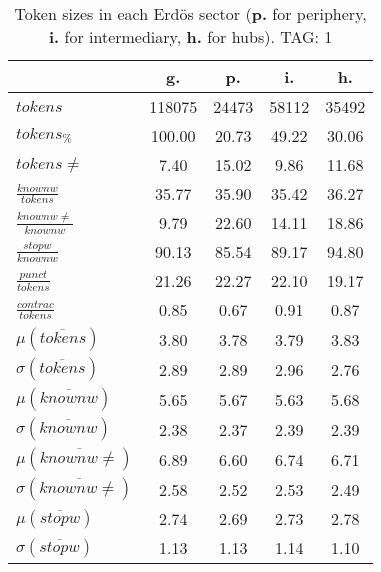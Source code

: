 \begin{table}[h!]
\begin{center}
\begin{tabular}{| l || c | c | c | c |}\hline
 & {\bf g.} & {\bf p.} & {\bf i.} & {\bf h.} \\\hline\hline
$tokens$ & 118075  & 24473  & 58112  & 35492 \\
$tokens_{\%}$ & 100.00  & 20.73  & 49.22  & 30.06 \\
$tokens \neq$ & 7.40  & 15.02  & 9.86  & 11.68 \\\hline
$\frac{knownw}{tokens}$ & 35.77  & 35.90  & 35.42  & 36.27 \\
$\frac{knownw \neq}{knownw}$ & 9.79  & 22.60  & 14.11  & 18.86 \\\hline
$\frac{stopw}{knownw}$ & 90.13  & 85.54  & 89.17  & 94.80 \\
$\frac{punct}{tokens}$ & 21.26  & 22.27  & 22.10  & 19.17 \\
$\frac{contrac}{tokens}$ & 0.85  & 0.67  & 0.91  & 0.87 \\\hline\hline
$\mu(\overline{tokens})$ & 3.80  & 3.78  & 3.79  & 3.83 \\
$\sigma(\overline{tokens})$ & 2.89  & 2.89  & 2.96  & 2.76 \\\hline
$\mu(\overline{knownw})$ & 5.65  & 5.67  & 5.63  & 5.68 \\
$\sigma(\overline{knownw})$ & 2.38  & 2.37  & 2.39  & 2.39 \\\hline
$\mu(\overline{knownw \neq})$ & 6.89  & 6.60  & 6.74  & 6.71 \\
$\sigma(\overline{knownw \neq})$ & 2.58  & 2.52  & 2.53  & 2.49 \\\hline
$\mu(\overline{stopw})$ & 2.74  & 2.69  & 2.73  & 2.78 \\
$\sigma(\overline{stopw})$ & 1.13  & 1.13  & 1.14  & 1.10 \\\hline
\end{tabular}
\caption{Token sizes in each Erd\"os sector ({{\bf p.}} for periphery, {{\bf i.}} for intermediary, {{\bf h.}} for hubs). TAG: 1}
\end{center}
\end{table}